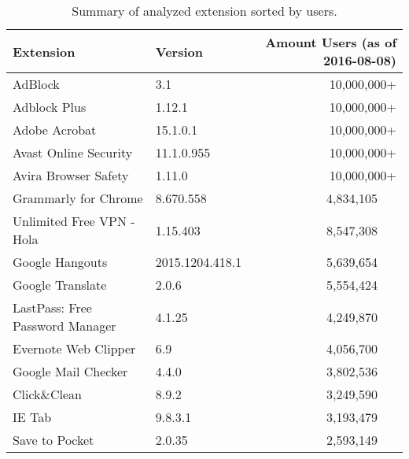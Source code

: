 	\begin{table}[h]
		\centering
		\begin{tabular}{|l|l|r|} \hline
			\textbf{Extension} & \textbf{Version} & \textbf{Amount Users} (as of 2016-08-08) \\ \hline
			AdBlock & 3.1 &  10,000,000+ \\ \hline
			Adblock Plus & 1.12.1 & 10,000,000+  \\ \hline
			Adobe Acrobat & 15.1.0.1 & 10,000,000+ \\ \hline
			Avast Online Security & 11.1.0.955 & 10,000,000+ \\ \hline
			Avira Browser Safety & 1.11.0 & 10,000,000+ \\ \hline
			Grammarly for Chrome & 8.670.558 & 4,834,105~~~ \\ \hline
			Unlimited Free VPN - Hola & 1.15.403 & 8,547,308~~~ \\ \hline
			Google Hangouts & 2015.1204.418.1 & 5,639,654~~~ \\ \hline
			Google Translate & 2.0.6 & 5,554,424~~~ \\ \hline
			LastPass: Free Password Manager & 4.1.25 & 4,249,870~~~ \\ \hline
			Evernote Web Clipper & 6.9 & 4,056,700~~~ \\ \hline
			Google Mail Checker & 4.4.0 & 3,802,536~~~ \\ \hline
			Click\&Clean & 8.9.2 & 3,249,590~~~  \\ \hline
			IE Tab & 9.8.3.1 & 3,193,479~~~ \\ \hline
			Save to Pocket & 2.0.35 & 2,593,149~~~ \\ \hline
		\end{tabular}
		\caption{Summary of analyzed extension sorted by users.}
		\label{tab:summaryEvaluatedExtensions}
	\end{table}
	
